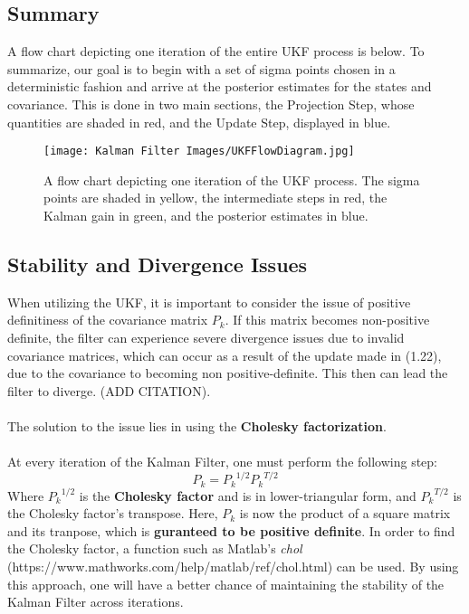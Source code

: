     \subsection{Summary}
    A flow chart depicting one iteration of the entire UKF process is below. To summarize, our goal is to begin with a set of sigma points chosen in a deterministic fashion and arrive at the posterior estimates for the states and covariance. This is done in two main sections, the Projection Step, whose quantities are shaded in red, and the Update Step, displayed in blue.
    
    \begin{figure} [H]
    \centering
    \texttt{[image: Kalman Filter Images/UKFFlowDiagram.jpg]}
    \caption{A flow chart depicting one iteration of the UKF process. The sigma points are shaded in yellow, the intermediate steps in red, the Kalman gain in green, and the posterior estimates in blue.}
    \end{figure}
    
    \subsection{Stability and Divergence Issues}
    When utilizing the UKF, it is important to consider the issue of positive definitiness of the covariance matrix $P_k$. If this matrix becomes non-positive definite, the filter can experience severe divergence issues due to invalid covariance matrices, which can occur as a result of the update made in (1.22), due to the covariance to becoming non positive-definite. This then can lead the filter to diverge.  (ADD CITATION). \\
    \\
    The solution to the issue lies in using the \textbf{Cholesky factorization}.
    \\
    \\
    At every iteration of the Kalman Filter, one must perform the following step:
    $$P_k = {P_k}^{1/2} {P_k}^{T/2}$$
    Where ${P_k}^{1/2}$ is the \textbf{Cholesky factor} and is in lower-triangular form, and ${P_k}^{T/2}$ is the Cholesky factor's transpose. Here, $P_k$ is now the product of a square matrix and its tranpose, which is \textbf{guranteed to be positive definite}. In order to find the Cholesky factor, a function such as Matlab's \emph{chol} (https://www.mathworks.com/help/matlab/ref/chol.html) can be used. By using this approach, one will have a better chance of maintaining the stability of the Kalman Filter across iterations.\\
    \\
    
